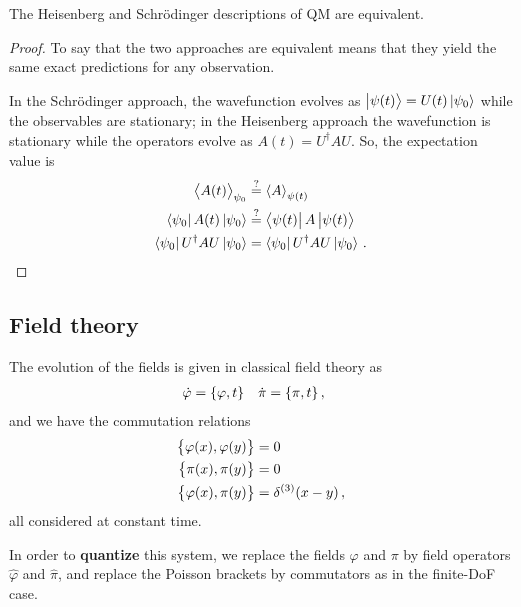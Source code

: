\documentclass[main.tex]{subfiles}
\begin{document}
\begin{claim}
The Heisenberg and Schrödinger descriptions of QM are equivalent.
\end{claim}

\begin{proof}
To say that the two approaches are equivalent means that they yield the same exact predictions for any observation.

In the Schrödinger approach, the wavefunction evolves as \(\ket{\psi (t)} = U(t) \ket{\psi_0 }\) while the observables are stationary; in the Heisenberg approach the wavefunction is stationary while the operators evolve as \(A(t) = U ^\dag A U\). So, the expectation value is 
%
\begin{subequations}
\begin{align}
\expval{A(t)}_{\psi_0 } &\overset{?}{=} \expval{A}_{\psi (t)}  \\
\bra{\psi_0 } A(t) \ket{\psi_0 } &\overset{?}{=} \bra{\psi (t)} A \ket{\psi (t)} \\
\bra{\psi_0 } U ^\dag A U\ket{\psi_0 } &= \bra{\psi_0 } U ^\dag A U \ket{\psi_0 } 
\,.
\end{align}
\end{subequations}
\end{proof}

\subsection{Field theory}

The evolution of the fields is given in classical field theory as 
%
\begin{align}
\dot{\varphi} &= \qty{\varphi , t} &
\dot{\pi} &= \qty{\pi , t}
\,,
\end{align}
%
and we have the commutation relations 
%
\begin{subequations}
\begin{align}
\qty{\varphi (x), \varphi (y)} &=0  \\
\qty{ \pi (x), \pi (y)} &= 0  \\
\qty{\varphi (x), \pi (y)} &= \delta^{(3)}(x-y)
\,,
\end{align}
\end{subequations}
%
all considered at constant time. 

In order to \textbf{quantize} this system, we replace the fields \(\varphi \) and \(\pi \) by field operators \(\hat{\varphi}\) and \(\hat{\pi}\), and replace the Poisson brackets by commutators as in the finite-DoF case.
\end{document}
